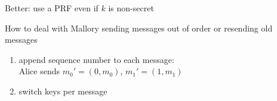 Better: use a PRF even if $k$ is non-secret

How to deal with Mallory sending messages out of order or resending old messages
\begin{enumerate}
\item append sequence number to each message:\\
        Alice sends $m_0' = (0, m_0)$, $m_1' = (1, m_1)$
\item switch keys per message
\end{enumerate}
